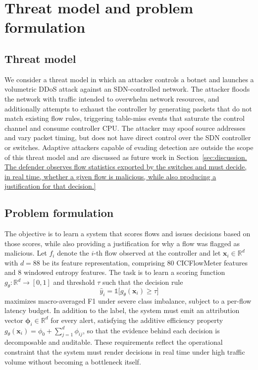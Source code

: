 \documentclass{ieeeaccess}
\begin{document}
\section{Threat model and problem formulation}
\label{sec:threat}

\subsection{Threat model}
We consider a threat model in which an attacker controls a botnet and launches a volumetric DDoS attack against an SDN-controlled network. The attacker floods the network with traffic intended to overwhelm network resources, and additionally attempts to exhaust the controller by generating packets that do not match existing flow rules, triggering table-miss events that saturate the control channel and consume controller CPU. The attacker may spoof source addresses and vary packet timing, but does not have direct control over the SDN controller or switches. Adaptive attackers capable of evading detection are outside the scope of this threat model and are discussed as future work in Section~\ref{sec:discussion. The defender observes flow statistics exported by the switches and must decide, in real time, whether a given flow is malicious, while also producing a justification for that decision.}

\subsection{Problem formulation}
The objective is to learn a system that scores flows and issues decisions based on those scores, while also providing a justification for why a flow was flagged as malicious. Let $f_i$ denote the $i$-th flow observed at the controller and let $\mathbf{x}_i \in \mathbb{R}^{d}$ with $d=88$ be its feature representation, comprising $80$ CICFlowMeter features and $8$ windowed entropy features. The task is to learn a scoring function $g_{\theta}\colon \mathbb{R}^{d} \to [0,1]$ and threshold $\tau$ such that the decision rule
\begin{equation}
\hat{y}_i = \mathbb{1}\bigl[g_{\theta}(\mathbf{x}_i) \geq \tau\bigr]
\label{eq:decision}
\end{equation}
maximizes macro-averaged F1 under severe class imbalance, subject to a per-flow latency budget. In addition to the label, the system must emit an attribution vector $\boldsymbol{\phi}_i \in \mathbb{R}^{d}$ for every alert, satisfying the additive efficiency property $g_{\theta}(\mathbf{x}_i) = \phi_0 + \sum_{j=1}^{d} \phi_{ij}$, so that the evidence behind each decision is decomposable and auditable. These requirements reflect the operational constraint that the system must render decisions in real time under high traffic volume without becoming a bottleneck itself.
\end{document}
